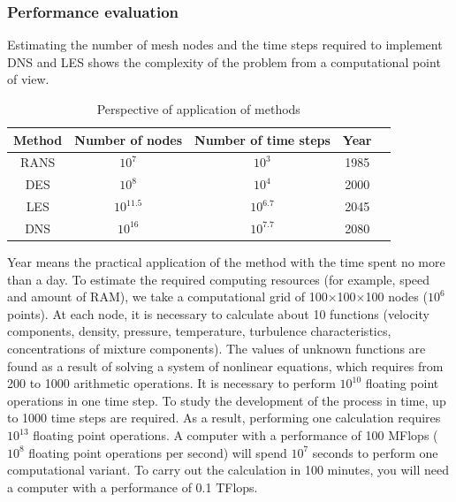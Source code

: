 \subsubsection{Performance evaluation}
	Estimating the number of mesh nodes and the time steps required to implement DNS and LES shows the complexity of the problem from a computational point of view.
	
	\begin{table}[H]
		\begin{center}
			\begin{tabular}{|c|c|c|c|c|}
				\hline
				Method & Number of nodes & Number of time steps & Year\\
				\hline
				RANS & $10^7$ & $10^3$ & 1985\\
				\hline
				DES & $10^8$ & $10^4$ & 2000\\
				\hline
				LES & $10^{11.5}$ & $10^{6.7}$ & 2045\\
				\hline
				DNS & $10^{16}$ & $10^{7.7}$ & 2080\\
				\hline
			\end{tabular}
		\end{center}
		\caption{Perspective of application of methods}
	\end{table}
	Year means the practical application of the method with the time spent no more than a day.
	To estimate the required computing resources (for example, speed and amount of RAM), we take a computational grid of 100$\times$100$\times$100 nodes ($10^6$ points). At each node, it is necessary to calculate about 10 functions (velocity components, density, pressure, temperature, turbulence characteristics, concentrations of mixture components). The values of unknown functions are found as a result of solving a system of nonlinear equations, which requires from 200 to 1000 arithmetic operations. It is necessary to perform $10^{10}$ floating point operations in one time step. To study the development of the process in time, up to 1000 time steps are required. As a result, performing one calculation requires $10^{13}$ floating point operations. A computer with a performance of 100 MFlops ($10^8$ floating point operations per second) will spend $10^7$ seconds to perform one computational variant. To carry out the calculation in 100 minutes, you will need a computer with a performance of 0.1 TFlops.